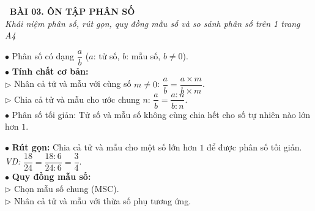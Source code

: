 \documentclass[14pt,a4paper,oneside]{extbook}
\begin{document}
\noindent
\begin{tcolorbox}[
  enhanced,
  colback=teal!8!white,
  colframe=teal!80!black,
  arc=3mm,
  boxrule=1.1pt,
  width=\linewidth,
  halign=center,
  top=2.2mm, bottom=2.2mm,
  left=3mm, right=3mm,
  drop fuzzy shadow
]
  {\large\bfseries\color{teal!95!black}\faBookmark\ BÀI 03. ÔN TẬP PHÂN SỐ}\\[2pt]
  {\scriptsize\color{black!75}\itshape Khái niệm phân số, rút gọn, quy đồng mẫu số và so sánh phân số trên 1 trang A4}
\end{tcolorbox}

\vspace{3.2mm}
\noindent
\begin{minipage}[t]{0.56\textwidth}
  \begin{tcolorbox}[
    enhanced,
    title={\footnotesize\bfseries\color{white}\faKey\ 1. Khái niệm và tính chất cơ bản},
    colback=blue!2!white,
    colframe=blue!75!black,
    arc=2.5mm, boxrule=0.8pt, top=1.8mm, bottom=1.8mm, left=2.2mm, right=2.2mm
  ]
    \footnotesize
    $\bullet$ Phân số có dạng $\dfrac{a}{b}$ ($a$: tử số, $b$: mẫu số, $b \neq 0$).\\
    $\bullet$ \textbf{Tính chất cơ bản:}\\
    $\triangleright$ Nhân cả tử và mẫu với cùng số $m \neq 0$: $\dfrac{a}{b} = \dfrac{a \times m}{b \times m}$.\\
    $\triangleright$ Chia cả tử và mẫu cho ước chung $n$: $\dfrac{a}{b} = \dfrac{a : n}{b : n}$.\\
    $\bullet$ Phân số tối giản: Tử số và mẫu số không cùng chia hết cho số tự nhiên nào lớn hơn $1$.
  \end{tcolorbox}
\end{minipage}%
\hfill
\begin{minipage}[t]{0.42\textwidth}
  \begin{tcolorbox}[
    enhanced,
    title={\footnotesize\bfseries\color{white}\faCrop\ 2. Rút gọn \& Quy đồng},
    colback=teal!2!white,
    colframe=teal!75!black,
    arc=2.5mm, boxrule=0.8pt, top=1.8mm, bottom=1.8mm, left=2mm, right=2mm
  ]
    \footnotesize
    $\bullet$ \textbf{Rút gọn:} Chia cả tử và mẫu cho một số lớn hơn $1$ để được phân số tối giản.\\
    \textit{VD:} $\dfrac{18}{24} = \dfrac{18:6}{24:6} = \dfrac{3}{4}$.\\[2pt]
    $\bullet$ \textbf{Quy đồng mẫu số:}\\
    $\triangleright$ Chọn mẫu số chung (MSC).\\
    $\triangleright$ Nhân cả tử và mẫu với thừa số phụ tương ứng.
  \end{tcolorbox}
\end{minipage}
\end{document}
